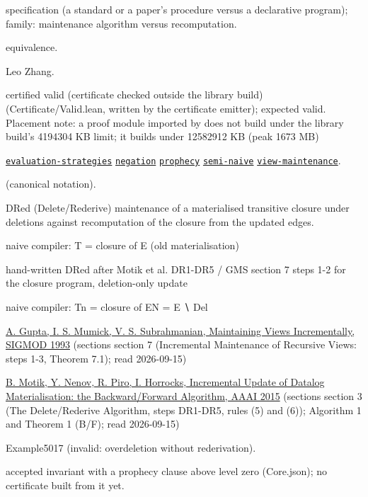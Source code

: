 \documentclass[10pt]{article}
\begin{document}
\begin{description}[leftmargin=2.6cm,style=nextline,itemsep=1pt]

\item[Category] specification (a standard or a paper's procedure versus a declarative program); family: maintenance algorithm versus recomputation.

\item[Kind] equivalence.

\item[Contributors] Leo Zhang.

\item[Status] certified valid (certificate checked outside the library build) (Certificate/Valid.lean, written by the certificate emitter); expected valid. Placement note: a proof module imported by  does not build under the library build's 4194304 KB limit; it builds under 12582912 KB (peak 1673 MB)

\item[Tags] \hyperref[tag:evaluation-strategies]{\texttt{evaluation-strategies}} \hyperref[tag:negation]{\texttt{negation}} \hyperref[tag:prophecy]{\texttt{prophecy}} \hyperref[tag:semi-naive]{\texttt{semi-naive}} \hyperref[tag:view-maintenance]{\texttt{view-maintenance}}.

\item[Input]  (canonical notation).

\item[Summary] DRed (Delete/Rederive) maintenance of a materialised transitive closure under deletions against recomputation of the closure from the updated edges.

\item[Sides] naive compiler: T = closure of E (old materialisation) \par hand-written DRed after Motik et al. DR1-DR5 / GMS section 7 steps 1-2 for the closure program, deletion-only update \par naive compiler: Tn = closure of EN = E ∖ Del

\item[Sources] {\raggedright \href{https://doi.org/10.1145/170035.170066}{A. Gupta, I. S. Mumick, V. S. Subrahmanian, Maintaining Views Incrementally, SIGMOD 1993} (sections section 7 (Incremental Maintenance of Recursive Views: steps 1-3, Theorem 7.1); read 2026-09-15) \par \href{https://doi.org/10.1609/aaai.v29i1.9409}{B. Motik, Y. Nenov, R. Piro, I. Horrocks, Incremental Update of Datalog Materialisation: the Backward/Forward Algorithm, AAAI 2015} (sections section 3 (The Delete/Rederive Algorithm, steps DR1-DR5, rules (5) and (6)); Algorithm 1 and Theorem 1 (B/F); read 2026-09-15)\par}

\item[Twin] Example5017 (invalid: overdeletion without rederivation).

\item[Prophecy] accepted invariant with a prophecy clause above level zero (Core.json); no certificate built from it yet.

\end{description}
\end{document}
